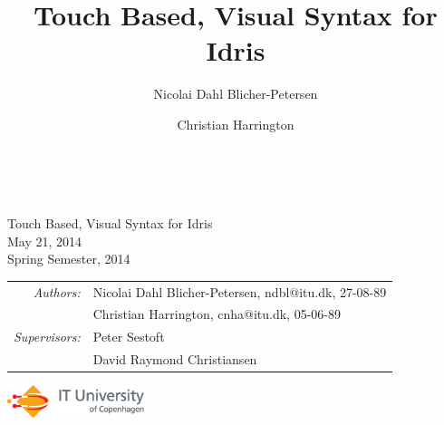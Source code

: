 \documentclass[a4paper,11pt]{report}
\begin{document}
\title{Touch Based, Visual Syntax for Idris}
\author{Nicolai Dahl Blicher-Petersen \and Christian Harrington \\
}


\begin{titlepage}
\ \\
\vspace{3cm}
\begin{center}
{\huge\sffamily
Touch Based, Visual Syntax for Idris
\\}\bigskip
{\large\sffamily
May 21, 2014
\\}
{\sffamily Spring Semester, 2014}
\end{center}
\vspace{3cm}
\large
\begin{center}
\begin{tabular}{r@{  }l}
\emph{\sffamily Authors:} & \textsf{Nicolai Dahl Blicher-Petersen, ndbl@itu.dk, 27-08-89}\\
 & \textsf{Christian Harrington, cnha@itu.dk, 05-06-89}\\
\emph{\sffamily Supervisors:} & \textsf{Peter Sestoft} \\
 & \textsf{David Raymond Christiansen}
\end{tabular}
\end{center}
\vfill
\includegraphics[width=4cm]{ITU_logo_ENG_horisontal}
\end{titlepage}

\end{document}
